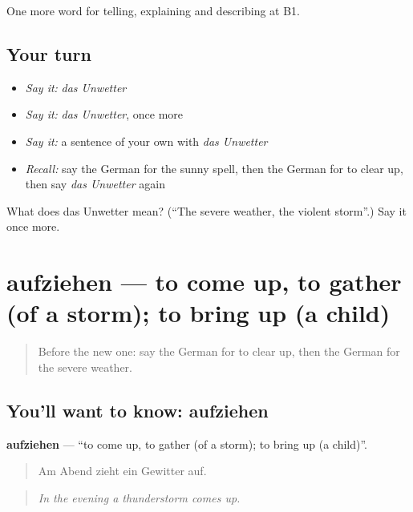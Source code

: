 \begin{grammarlens}[title={What you've built}]
One more word for telling, explaining and describing at B1.
\end{grammarlens}

\subsection*{Your turn}
\begin{itemize}
\raggedright
  \item \emph{Say it:} \emph{das Unwetter}
  \item \emph{Say it:} \emph{das Unwetter}, once more
  \item \emph{Say it:} a sentence of your own with \emph{das Unwetter}
  \item \emph{Recall:} say the German for the sunny spell, then the German for to clear up, then say \emph{das Unwetter} again
\end{itemize}

\begin{tcolorbox}[breakable,colback=teal!4,colframe=teal!35!black,title={Before you move on}]
What does das Unwetter mean? (\textquotedblleft{}The severe weather, the violent storm\textquotedblright{}.) Say it once more.
\end{tcolorbox}
\section[aufziehen]{aufziehen — to come up, to gather (of a storm); to bring up (a child)}

\label{lesson:GE-C462-aufziehen}



\begin{quote}
Before the new one: say the German for to clear up, then the German for the severe weather.
\end{quote}

\subsection*{You'll want to know: aufziehen}
\textbf{aufziehen} — \textquotedblleft{}to come up, to gather (of a storm); to bring up (a child)\textquotedblright{}.

\begin{quote}
Am Abend zieht ein Gewitter auf.
\end{quote}

\begin{quote}
\emph{In the evening a thunderstorm comes up.}
\end{quote}


